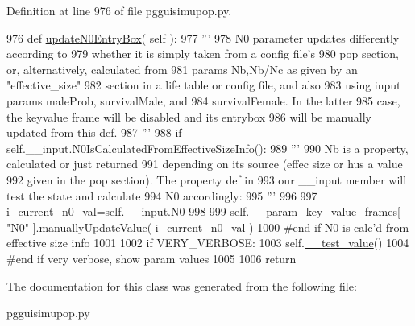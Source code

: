 Definition at line 976 of file pgguisimupop.\+py.


\begin{DoxyCode}
976     \textcolor{keyword}{def }\hyperlink{classnegui_1_1pgguisimupop_1_1PGGuiSimuPop_ac193cf44f5e4f1e5b146a43e9563d7b0}{updateN0EntryBox}( self ):
977         \textcolor{stringliteral}{'''}
978 \textcolor{stringliteral}{        N0 parameter updates differently according to}
979 \textcolor{stringliteral}{        whether it is simply taken from a config file's}
980 \textcolor{stringliteral}{        pop section, or, alternatively, calculated from}
981 \textcolor{stringliteral}{        params Nb,Nb/Nc as given by an "effective\_size"}
982 \textcolor{stringliteral}{        section in a life table or config file, and also}
983 \textcolor{stringliteral}{        using input params maleProb, survivalMale, and}
984 \textcolor{stringliteral}{        survivalFemale.  In the latter}
985 \textcolor{stringliteral}{        case, the keyvalue frame will be disabled and its entrybox}
986 \textcolor{stringliteral}{        will be manually updated from this def.  }
987 \textcolor{stringliteral}{        '''}
988         \textcolor{keywordflow}{if} self.\_\_input.N0IsCalculatedFromEffectiveSizeInfo():
989             \textcolor{stringliteral}{'''}
990 \textcolor{stringliteral}{            Nb is a property, calculated or just returned}
991 \textcolor{stringliteral}{            depending on its source (effec size or hus a value}
992 \textcolor{stringliteral}{            given in the pop section). The property def in}
993 \textcolor{stringliteral}{            our \_\_input member will test the state and calculate}
994 \textcolor{stringliteral}{            N0 accordingly:}
995 \textcolor{stringliteral}{            '''}
996 
997             i\_current\_n0\_val=self.\_\_input.N0
998 
999             self.\hyperlink{classnegui_1_1pgguisimupop_1_1PGGuiSimuPop_a272523ce4bad4d1073c506e858c59996}{\_\_param\_key\_value\_frames}[ \textcolor{stringliteral}{"N0"} ].manuallyUpdateValue( 
      i\_current\_n0\_val )
1000         \textcolor{comment}{#end if N0 is calc'd from effective size info}
1001 
1002         \textcolor{keywordflow}{if} VERY\_VERBOSE:
1003             self.\hyperlink{classnegui_1_1pgguisimupop_1_1PGGuiSimuPop_a1a916d4c19afe08b2c7772d099c71f3f}{\_\_test\_value}()
1004         \textcolor{comment}{#end if very verbose, show param values}
1005 
1006         \textcolor{keywordflow}{return}
\end{DoxyCode}


The documentation for this class was generated from the following file\+:\begin{DoxyCompactItemize}
\item 
pgguisimupop.\+py\end{DoxyCompactItemize}
